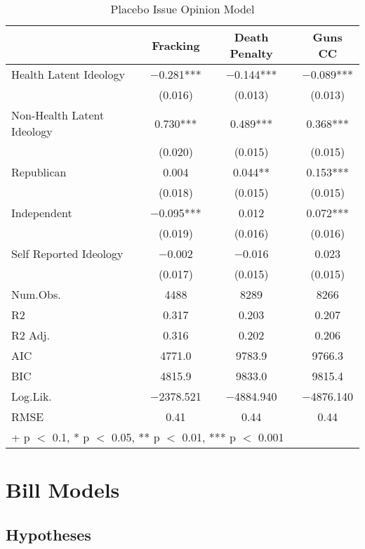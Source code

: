 \documentclass[
  oneside]{book}
\begin{document}
\begin{table}

\caption{\label{tab:unnamed-chunk-25}Placebo Issue Opinion Model}
\centering
\begin{tabular}[t]{lccc}
\toprule
  & Fracking & Death Penalty & Guns CC\\
\midrule
Health Latent Ideology & \num{-0.281}*** & \num{-0.144}*** & \num{-0.089}***\\
 & (\num{0.016}) & (\num{0.013}) & (\num{0.013})\\
Non-Health Latent Ideology & \num{0.730}*** & \num{0.489}*** & \num{0.368}***\\
 & (\num{0.020}) & (\num{0.015}) & (\num{0.015})\\
Republican & \num{0.004} & \num{0.044}** & \num{0.153}***\\
 & (\num{0.018}) & (\num{0.015}) & (\num{0.015})\\
Independent & \num{-0.095}*** & \num{0.012} & \num{0.072}***\\
 & (\num{0.019}) & (\num{0.016}) & (\num{0.016})\\
Self Reported Ideology & \num{-0.002} & \num{-0.016} & \num{0.023}\\
 & (\num{0.017}) & (\num{0.015}) & (\num{0.015})\\
\midrule
Num.Obs. & \num{4488} & \num{8289} & \num{8266}\\
R2 & \num{0.317} & \num{0.203} & \num{0.207}\\
R2 Adj. & \num{0.316} & \num{0.202} & \num{0.206}\\
AIC & \num{4771.0} & \num{9783.9} & \num{9766.3}\\
BIC & \num{4815.9} & \num{9833.0} & \num{9815.4}\\
Log.Lik. & \num{-2378.521} & \num{-4884.940} & \num{-4876.140}\\
RMSE & \num{0.41} & \num{0.44} & \num{0.44}\\
\bottomrule
\multicolumn{4}{l}{\rule{0pt}{1em}+ p $<$ 0.1, * p $<$ 0.05, ** p $<$ 0.01, *** p $<$ 0.001}\\
\end{tabular}
\end{table}

\hypertarget{bill-models}{%
\chapter{Bill Models}\label{bill-models}}

\hypertarget{hypotheses}{%
\section{Hypotheses}\label{hypotheses}}
\end{document}
